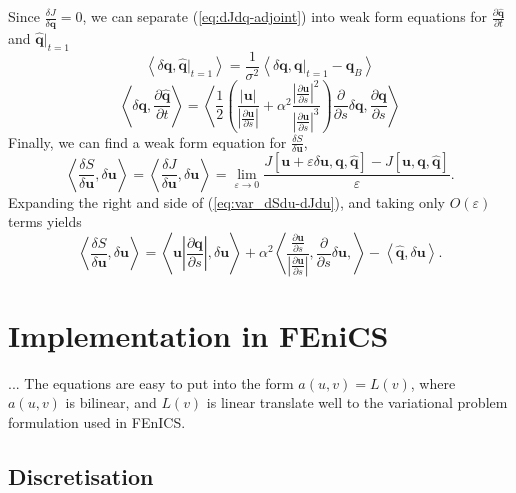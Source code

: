 \documentclass[a4paper, 12pt]{article}
\newcommand{\eq}[1]{(\ref{eq:#1})}
\newcommand{\vect}[1]{\ensuremath{\mathbf{#1}}}
\newcommand{\hvect}[1]{\ensuremath{\hat{\vect{#1}}}}
\newcommand{\pp}[2]{\frac{\partial #1}{\partial #2}}
\newcommand{\vv}[2]{\frac{\delta #1}{\delta #2}}
\newcommand{\angles}[1]{\left\langle #1 \right\rangle}
\newcommand{\eps}{\varepsilon}
\begin{document}
Since $\vv{J}{\vect q} = 0$, we can separate \eq{dJdq-adjoint} into weak form equations for $\pp{\hvect q}{t}$ and $\hvect q \big|_{t=1}$
  \begin{equation}
    \label{eq:qh_t1}
    \angles{\delta \vect q, \hvect q\big|_{t=1}} = \frac{1}{\sigma^2}\angles{\delta \vect q, \vect q \big|_{t=1} - \vect q_B}
  \end{equation}
  \begin{equation}
    \label{eq:dqhdt}
    \angles{\delta \vect q, \pp{\hvect q}{t}} = \angles{\frac{1}{2}\left(\frac{\left|\vect u\right|}{\left|\pp{\vect u}{s}\right|} + \alpha^2\frac{\left|\pp{\vect u}{s}\right|^2}{\left|\pp{\vect u}{s}\right|^3}\right)\pp{}{s}\delta \vect q, \pp{\vect q}{s}}
  \end{equation}
Finally, we can find a weak form equation for $\vv{S}{\vect u}$,
\begin{equation}
  \label{eq:var_dSdu-dJdu}
  \angles{\vv{S}{\vect u}, \delta \vect u} = \angles{\vv{J}{\vect u}, \delta \vect u} =
  \lim_{\eps \rightarrow 0} \frac{J[\vect u + \eps \delta \vect u, \vect q, \hvect q] - J[\vect u, \vect q, \hvect q]}{\eps}.
\end{equation}
Expanding the right and side of \eq{var_dSdu-dJdu}, and taking only $O(\eps)$ terms yields
\begin{equation}
  \label{eq:dSdu-deltau}
  \angles{\vv{S}{\vect u}, \delta \vect u} = \angles{\vect u \left|\pp{\vect q}{s}\right|,\delta \vect u} 
  + \alpha^2 \angles{\frac{\pp{\vect u}{s}}{\left|\pp{\vect u}{s}\right|},\pp{}{s}\delta \vect u,}
    - \angles{\hvect q,\delta \vect u}.
\end{equation}


\section{Implementation in FEniCS}
... The equations are easy to put into the form $a(u,v) = L(v)$, where $a(u,v)$ is bilinear, and $L(v)$ is linear translate well to the variational problem formulation used in FEnICS.

\subsection{Discretisation}

\end{document}
